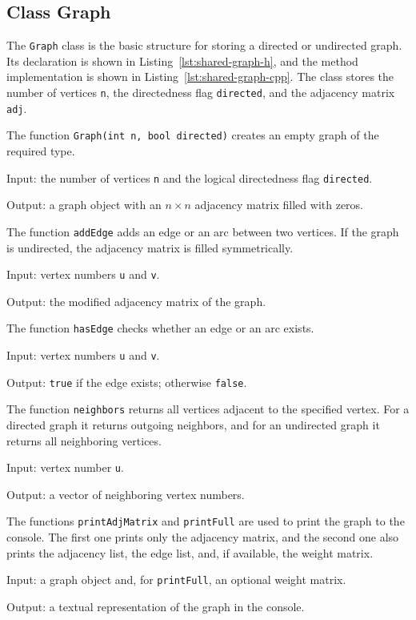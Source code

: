 \documentclass[a4paper,final]{article}
\begin{document}
\subsection{Class Graph}

The \texttt{Graph} class is the basic structure for storing a directed or undirected graph. Its declaration is shown in Listing~\ref{lst:shared-graph-h}, and the method implementation is shown in Listing~\ref{lst:shared-graph-cpp}. The class stores the number of vertices \texttt{n}, the directedness flag \texttt{directed}, and the adjacency matrix \texttt{adj}.

The function \texttt{Graph(int n, bool directed)} creates an empty graph of the required type.

Input: the number of vertices \texttt{n} and the logical directedness flag \texttt{directed}.

Output: a graph object with an $n \times n$ adjacency matrix filled with zeros.

The function \texttt{addEdge} adds an edge or an arc between two vertices. If the graph is undirected, the adjacency matrix is filled symmetrically.

Input: vertex numbers \texttt{u} and \texttt{v}.

Output: the modified adjacency matrix of the graph.

The function \texttt{hasEdge} checks whether an edge or an arc exists.

Input: vertex numbers \texttt{u} and \texttt{v}.

Output: \texttt{true} if the edge exists; otherwise \texttt{false}.

The function \texttt{neighbors} returns all vertices adjacent to the specified vertex. For a directed graph it returns outgoing neighbors, and for an undirected graph it returns all neighboring vertices.

Input: vertex number \texttt{u}.

Output: a vector of neighboring vertex numbers.

The functions \texttt{printAdjMatrix} and \texttt{printFull} are used to print the graph to the console. The first one prints only the adjacency matrix, and the second one also prints the adjacency list, the edge list, and, if available, the weight matrix.

Input: a graph object and, for \texttt{printFull}, an optional weight matrix.

Output: a textual representation of the graph in the console.
\end{document}
